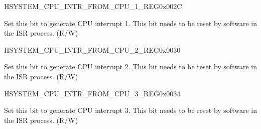 \begin{register}{H}{SYSTEM\_CPU\_INTR\_FROM\_CPU\_1\_REG}{0x002C}\label{regdesc:SYSTEMCPUINTRFROMCPU1REG}
%
%
\regnewline%
\begin{regdesc}\begin{reglist}
\label{fielddesc:SYSTEMCPUINTRFROMCPU1}\item [SYSTEM\_CPU\_INTR\_FROM\_CPU\_1] Set this bit to generate CPU interrupt 1. This bit needs to be reset by software in the ISR process. (R/W)
\end{reglist}\end{regdesc}
\end{register}


\begin{register}{H}{SYSTEM\_CPU\_INTR\_FROM\_CPU\_2\_REG}{0x0030}\label{regdesc:SYSTEMCPUINTRFROMCPU2REG}
%
%
\regnewline%
\begin{regdesc}\begin{reglist}
\label{fielddesc:SYSTEMCPUINTRFROMCPU2}\item [SYSTEM\_CPU\_INTR\_FROM\_CPU\_2] Set this bit to generate CPU interrupt 2. This bit needs to be reset by software in the ISR process. (R/W)
\end{reglist}\end{regdesc}
\end{register}


\begin{register}{H}{SYSTEM\_CPU\_INTR\_FROM\_CPU\_3\_REG}{0x0034}\label{regdesc:SYSTEMCPUINTRFROMCPU3REG}
%
%
\regnewline%
\begin{regdesc}\begin{reglist}
\label{fielddesc:SYSTEMCPUINTRFROMCPU3}\item [SYSTEM\_CPU\_INTR\_FROM\_CPU\_3] Set this bit to generate CPU interrupt 3. This bit needs to be reset by software in the ISR process. (R/W)
\end{reglist}\end{regdesc}
\end{register}


